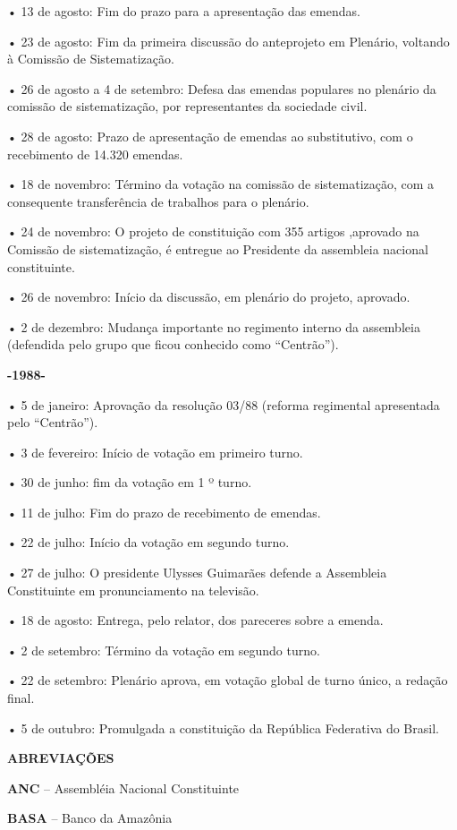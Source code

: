 • 13 de agosto: Fim do prazo para a apresentação das emendas.

• 23 de agosto: Fim da primeira discussão do anteprojeto em Plenário,
voltando à Comissão de Sistematização.

• 26 de agosto a 4 de setembro: Defesa das emendas populares no plenário
da comissão de sistematização, por representantes da sociedade civil.

• 28 de agosto: Prazo de apresentação de emendas ao substitutivo, com o
recebimento de 14.320 emendas.

• 18 de novembro: Término da votação na comissão de sistematização, com
a consequente transferência de trabalhos para o plenário.

• 24 de novembro: O projeto de constituição com 355 artigos ,aprovado na
Comissão de sistematização, é entregue ao Presidente da assembleia
nacional constituinte.

• 26 de novembro: Início da discussão, em plenário do projeto, aprovado.

• 2 de dezembro: Mudança importante no regimento interno da assembleia
(defendida pelo grupo que ficou conhecido como ``Centrão'').

\textbf{-1988-}

• 5 de janeiro: Aprovação da resolução 03/88 (reforma regimental
apresentada pelo ``Centrão'').

• 3 de fevereiro: Início de votação em primeiro turno.

• 30 de junho: fim da votação em 1 º turno.

• 11 de julho: Fim do prazo de recebimento de emendas.

• 22 de julho: Início da votação em segundo turno.

• 27 de julho: O presidente Ulysses Guimarães defende a Assembleia
Constituinte em pronunciamento na televisão.

• 18 de agosto: Entrega, pelo relator, dos pareceres sobre a emenda.

• 2 de setembro: Término da votação em segundo turno.

• 22 de setembro: Plenário aprova, em votação global de turno único, a
redação final.

• 5 de outubro: Promulgada a constituição da República Federativa do
Brasil.

\textbf{ABREVIAÇÕES}

\textbf{ANC} -- Assembléia Nacional Constituinte

\textbf{BASA} -- Banco da Amazônia

